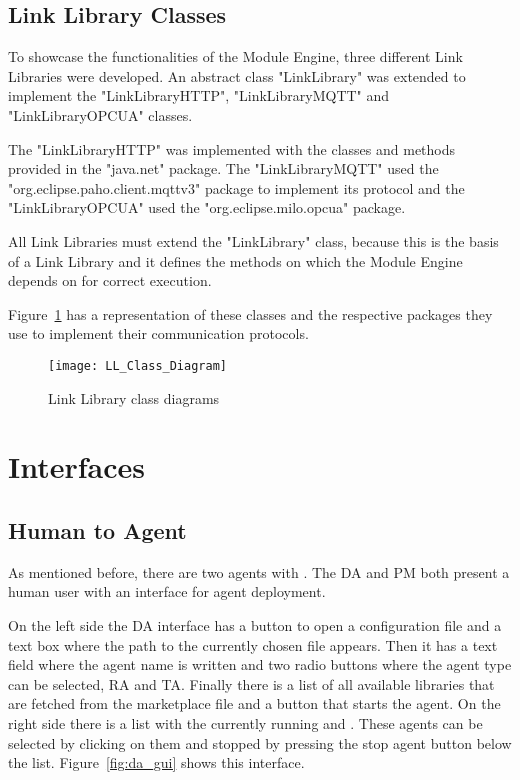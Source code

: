 \subsection{Link Library Classes}
\label{subsec:link_library_class}

To showcase the functionalities of the Module Engine, three different Link Libraries were developed. An abstract class "LinkLibrary" was extended to implement the "LinkLibraryHTTP", "LinkLibraryMQTT" and "LinkLibraryOPCUA" classes.

The "LinkLibraryHTTP" was implemented with the classes and methods provided in the "java.net" package. The "LinkLibraryMQTT" used the "org.eclipse.paho.client.mqttv3" package to implement its protocol and the "LinkLibraryOPCUA" used the "org.eclipse.milo.opcua" package.

All Link Libraries must extend the "LinkLibrary" class, because this is the basis of a Link Library and it defines the methods on which the Module Engine depends on for correct execution.

Figure~\ref{fig:link_library_class_diagram} has a representation of these classes and the respective packages they use to implement their communication protocols.\\

\begin{figure}[h!]
	\centering
	\texttt{[image: LL\_Class\_Diagram]}
	\caption{Link Library class diagrams}
	\label{fig:link_library_class_diagram}
\end{figure}

\section{Interfaces}
\label{sec:interfaces}

\subsection{Human to Agent}
\label{subsec:human_to_agent_interface}

As mentioned before, there are two agents with . The \acrlong{DA} and \acrlong{PM} both present a human user with an interface for agent deployment.

On the left side the \acrshort{DA} interface has a button to open a configuration file and a text box where the path to the currently chosen file appears. Then it has a text field where the agent name is written and two radio buttons where the agent type can be selected, \acrlong{RA} and \acrlong{TA}. Finally there is a list of all available libraries that are fetched from the marketplace file and a button that starts the agent. On the right side there is a list with the currently running  and . These agents can be selected by clicking on them and stopped by pressing the stop agent button below the list. Figure~\ref{fig:da_gui} shows this interface.\\

